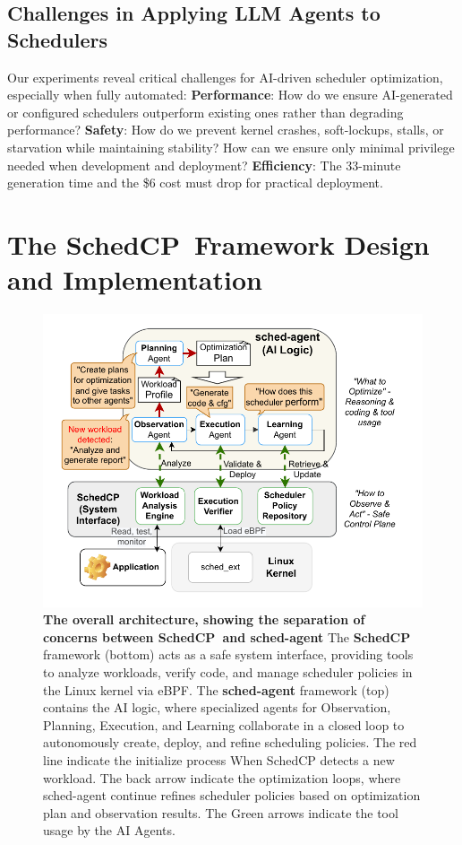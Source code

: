 \documentclass[preprint]{article}
\newcommand{\sys}{SchedCP\xspace}
\newcommand{\agent}{sched-agent\xspace}
\begin{document}
\subsection{Challenges in Applying LLM Agents to Schedulers}

Our experiments reveal critical challenges for AI-driven scheduler optimization, especially when fully automated: \textbf{Performance}: How do we ensure AI-generated or configured schedulers outperform existing ones rather than degrading performance? \textbf{Safety}: How do we prevent kernel crashes, soft-lockups, stalls, or starvation while maintaining stability? How can we ensure only minimal privilege needed when development and deployment? \textbf{Efficiency}: The 33-minute generation time and the \$6 cost must drop for practical deployment.
\section{The \sys\ Framework Design and Implementation}
\label{sec:schedcp_framework}

\begin{figure}
    \centering
    \includegraphics[width=\columnwidth]{sections/img/arch-scheddcp.pdf}
    \caption{
        \textbf{The overall architecture, showing the separation of concerns between \sys\ and \agent } 
        The \textbf{\sys} framework (bottom) acts as a safe system interface, providing tools to analyze workloads, verify code, and manage scheduler policies in the Linux kernel via eBPF.
        The \textbf{\agent} framework (top) contains the AI logic, where specialized agents for Observation, Planning, Execution, and Learning collaborate in a closed loop to autonomously create, deploy, and refine scheduling policies. The red line indicate the initialize process When \sys detects a new workload. The back arrow indicate the optimization loops, where \agent continue refines scheduler policies based on optimization plan and observation results. The Green arrows indicate the tool usage by the AI Agents.
    }
    \label{fig:frameworkarch}
\end{figure}
\end{document}
